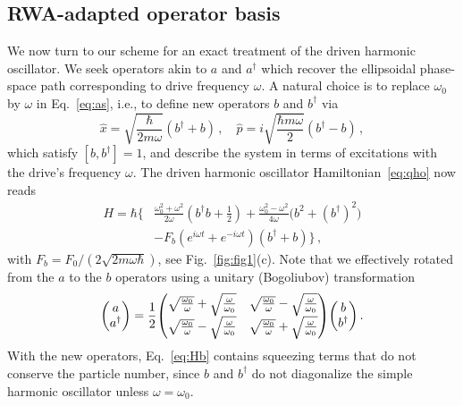 \subsection{RWA-adapted operator basis}
We now turn to our scheme for an exact treatment of the driven harmonic oscillator. We seek operators akin to $a$ and $a^\dagger$ which recover the ellipsoidal phase-space path corresponding to drive frequency $\omega$. A natural choice is to replace $\omega_0$ by $\omega$ in Eq.~\eqref{eq:as}, i.e., to define new operators $b$ and $b^\dagger$ via
\begin{equation} \label{eq:bs}
\hat{x} =\sqrt{\frac{\hbar}{2m\omega}}(b^\dagger+b)\,, \quad \hat{p} = i\sqrt{\frac{\hbar m \omega}{2}}(b^\dagger - b)\,,
\end{equation}
which satisfy $[b, b^\dagger]=1$, and describe the system in terms of excitations with the drive's frequency $\omega$. The driven harmonic oscillator Hamiltonian~\eqref{eq:qho} now reads
\begin{align} 
H = \hbar \bigg\{ &\frac{\omega_0^2 + \omega^2}{2 \omega}  \left (b^\dagger b + \frac{1}{2} \right)+ \frac{\omega_0^2  - \omega^2}{4 \omega} \big(b^2 + (b^\dagger)^2  \big)\nonumber
\\ &- F_b(e^{i\omega t} +e^{-i\omega t})(b^\dagger+b) \bigg\} \,,\label{eq:Hb}
\end{align}
with $F_b = F_0 / (2 \sqrt{2 m \omega \hbar})$, see Fig.~\ref{fig:fig1}(c). Note that we effectively rotated from the $a$ to the $b$ operators using a unitary (Bogoliubov) transformation~\cite{Xiao_2009}
\begin{equation}
\mqty(a \\ a^\dagger) = \frac{1}{2} \mqty( \sqrt{\frac{\omega_0}{\omega}} + \sqrt{\frac{\omega}{\omega_0}} & \sqrt{\frac{\omega_0}{\omega}} - \sqrt{\frac{\omega}{\omega_0}} \\ \sqrt{\frac{\omega_0}{\omega}} - \sqrt{\frac{\omega}{\omega_0}} & \sqrt{\frac{\omega_0}{\omega}} + \sqrt{\frac{\omega}{\omega_0}}) \mqty(b \\ b^\dagger) \,.
\end{equation}
With the new operators, Eq.~\eqref{eq:Hb} contains squeezing terms that do not conserve the particle number, since $b$ and $b^\dagger$ do not diagonalize the simple harmonic oscillator unless $\omega = \omega_0$. 

